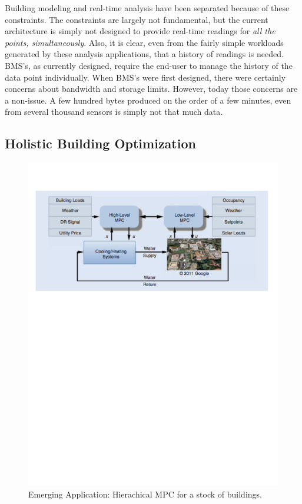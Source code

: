 Building modeling and real-time analysis have been separated because of these constraints.  The constraints are largely not
fundamental, but the current architecture is simply not designed to provide real-time readings for \emph{all the points, simultaneously}.
Also, it is clear, even from the fairly simple workloads generated by these analysis applications, that a history of readings
is needed.  BMS's, as currently designed, require the end-user to manage the history of the data point individually.
When BMS's were first designed, there were certainly concerns about bandwidth and storage limits.  However, today those concerns
are a non-issue.  A few hundred bytes produced on the order of a few minutes, even from several thousand sensors is simply not
that much data.


\subsection{Holistic Building Optimization}

\begin{figure}[t!] %
\centering
\includegraphics[width=0.75\columnwidth]{figs/mpc1}
\caption{Emerging Application: Hierachical MPC for a stock of buildings.}
\label{fig:mpc1}
\end{figure}

